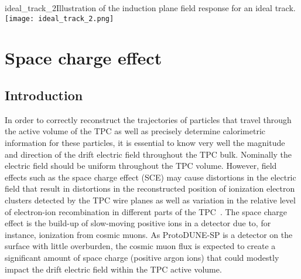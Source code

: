 \begin{cdrfigure}{ideal_track_2}{Illustration of the induction plane field response for an ideal track.}
\texttt{[image: ideal\_track\_2.png]}
\end{cdrfigure}





\section{Space charge effect}

\subsection{Introduction} \label{sec:SCEintro}

In order to correctly reconstruct the trajectories of particles that travel through the active volume of the TPC as well as precisely determine calorimetric information for these particles, it is essential to know very well the magnitude and direction of the drift electric field throughout the TPC bulk.  Nominally the electric field should be uniform throughout the TPC volume.  However, field effects such as the space charge effect (SCE) may cause distortions in the electric field that result in distortions in the reconstructed position of ionization electron clusters detected by the TPC wire planes as well as variation in the relative level of electron-ion recombination in different parts of the TPC~\cite{KirkSCE}.  The space charge effect is the build-up of slow-moving positive ions in a detector due to, for instance, ionization from cosmic muons.  As ProtoDUNE-SP is a detector on the surface with little overburden, the cosmic muon flux is expected to create a significant amount of space charge (positive argon ions) that could modestly impact the drift electric field within the TPC active volume.

